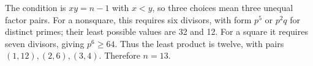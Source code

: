 The condition is $xy=n-1$ with $x<y$, so three choices mean three unequal factor pairs. For a nonsquare, this requires six divisors, with form $p^5$ or $p^2q$ for distinct primes; their least possible values are 32 and 12. For a square it requires seven divisors, giving $p^6\ge64$. Thus the least product is twelve, with pairs $(1,12),(2,6),(3,4)$. Therefore $\boxed{n=13}$.
